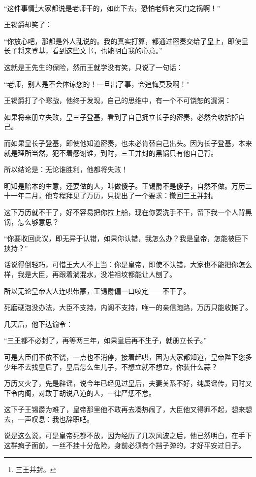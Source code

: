 \begin{multicols}{\theparacolNo}
“这件事情\footnote{三王并封。}大家都说是老师干的，如此下去，恐怕老师有灭门之祸啊！”

王锡爵却笑了：

“你放心吧，那都是外人乱说的。我的真实打算，都通过密奏交给了皇上，即使皇长子将来登基，看到这些文书，也能明白我的心意。”

这就是王先生的保险，然而王就学没有笑，只说了一句话：

“老师，别人是不会体谅您的！一旦出了事，会追悔莫及啊！”

王锡爵打了个寒战，他终于发现，自己的思维中，有一个不可饶恕的漏洞：

如果将来册立失败，皇三子登基，看到了自己拥立长子的密奏，必然会收拾掉自己。

而如果皇长子登基，即使他知道密奏，也未必肯替自己出头。因为长子登基，本来就是理所当然，犯不着感谢谁，到时，三王并封的黑锅只有他自己背。

所以结论是：无论谁胜利，他都将失败！

明知是赔本的生意，还要做的人，叫做傻子。王锡爵不是傻子，自然不做。万历二十一年二月，他专程拜见了万历，只提出了一个要求：撤回三王并封。

这下万历就不干了，好不容易把你拉上船，现在你要洗手不干，留下我一个人背黑锅，怎么够意思？

“你要收回此议，即无异于认错，如果你认错，我怎么办？我是皇帝，怎能被臣下挟持？”

话说得倒轻巧，可惜王大人不上当：你是皇帝，即使不认错，大家也不能把你怎么样，我是大臣，再跟着淌混水，没准祖坟都能让人刨了。

所以无论皇帝大人连哄带蒙，王锡爵偏一口咬定——不干了。

死磨硬泡没办法，大臣不支持，内阁不支持，唯一的亲信跑路，万历只能收摊了。

几天后，他下达谕令：

“三王都不必封了，再等两三年，如果皇后再不生子，就册立长子。”

可是大臣们不依不饶，一点也不消停，接着起哄，因为大家都知道，皇帝陛下您多少年不去找皇后了，皇后怎么生儿子，不想立就不想立，你装什么蒜？

万历又火了，先是辟谣，说今年已经见过皇后，夫妻关系不好，纯属谣传，同时又下令内阁，对敢于胡说八道的人，一律严惩不怠。

这下子王锡爵为难了，皇帝那里他不敢再去凑热闹了，大臣他又得罪不起，想来想去，一声叹息：我也辞职吧。

说是这么说，可是皇帝死都不放，因为经历了几次风波之后，他已然明白，在手下这群疯子面前，一丝不挂十分危险，身前必须有个挡子弹的，才好平安过日子。


\end{multicols}
